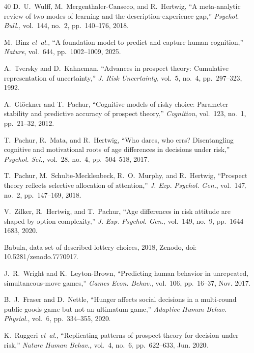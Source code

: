 \documentclass[journal]{IEEEtran}
\begin{document}
\begin{thebibliography}{40}
D.~U.~Wulff, M.~Mergenthaler-Canseco, and R.~Hertwig, ``A meta-analytic review of two modes of learning and the description-experience gap,''
\emph{Psychol. Bull.}, vol.~144, no.~2, pp.~140--176, 2018. %

M.~Binz \emph{et~al.}, ``A foundation model to predict and capture human cognition,''
\emph{Nature}, vol.~644, pp.~1002--1009, 2025. %

A.~Tversky and D.~Kahneman, ``Advances in prospect theory: Cumulative representation of uncertainty,''
\emph{J. Risk Uncertainty}, vol.~5, no.~4, pp.~297--323, 1992.

A.~Gl\"ockner and T.~Pachur, ``Cognitive models of risky choice: Parameter stability and predictive accuracy of prospect theory,''
\emph{Cognition}, vol.~123, no.~1, pp.~21--32, 2012. %

T.~Pachur, R.~Mata, and R.~Hertwig, ``Who dares, who errs? Disentangling cognitive and motivational roots of age differences in decisions under risk,''
\emph{Psychol. Sci.}, vol.~28, no.~4, pp.~504--518, 2017. %

T.~Pachur, M.~Schulte-Mecklenbeck, R.~O.~Murphy, and R.~Hertwig, ``Prospect theory reflects selective allocation of attention,''
\emph{J. Exp. Psychol. Gen.}, vol.~147, no.~2, pp.~147--169, 2018. %

V.~Zilker, R.~Hertwig, and T.~Pachur, ``Age differences in risk attitude are shaped by option complexity,''
\emph{J. Exp. Psychol. Gen.}, vol.~149, no.~9, pp.~1644--1683, 2020. %

Babula, data set of described-lottery choices, 2018, Zenodo, doi: 10.5281/zenodo.7770917. %

J.~R.~Wright and K.~Leyton-Brown, ``Predicting human behavior in unrepeated, simultaneous-move games,''
\emph{Games Econ. Behav.}, vol.~106, pp.~16--37, Nov. 2017.

B.~J.~Fraser and D.~Nettle, ``Hunger affects social decisions in a multi-round public goods game but not an ultimatum game,''
\emph{Adaptive Human Behav. Physiol.}, vol.~6, pp.~334--355, 2020.

K.~Ruggeri \emph{et~al.}, ``Replicating patterns of prospect theory for decision under risk,''
\emph{Nature Human Behav.}, vol.~4, no.~6, pp.~622--633, Jun. 2020.


\end{thebibliography}
\end{document}

